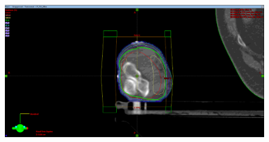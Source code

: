 \begin{figure}[htpb]
	\centering
	\includegraphics[width=0.7\linewidth]{../Bilder/EllenbogenZ}
	\caption{}
	\label{fig:ellenbogenz}
\end{figure}

